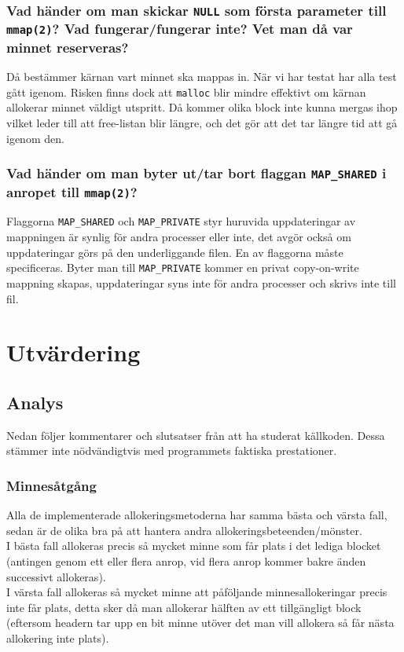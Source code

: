 \documentclass[a4paper]{article}
\begin{document}
\subsubsection*{Vad händer om man skickar \texttt{NULL} som första parameter till \texttt{mmap(2)}? Vad fungerar/fungerar inte? Vet man då var minnet reserveras?}
Då bestämmer kärnan vart minnet ska mappas in. När vi har testat har alla test gått igenom. Risken finns dock att \texttt{malloc} blir mindre effektivt om kärnan allokerar minnet väldigt utspritt. Då kommer olika block inte kunna mergas ihop vilket leder till att free-listan blir längre, och det gör att det tar längre tid att gå igenom den.

\subsubsection*{Vad händer om man byter ut/tar bort flaggan \texttt{MAP\_SHARED} i anropet till \texttt{mmap(2)}?}
Flaggorna \texttt{MAP\_SHARED} och \texttt{MAP\_PRIVATE} styr huruvida uppdateringar av mappningen är synlig för andra processer eller inte, det avgör också om uppdateringar görs på den underliggande filen. En av flaggorna måste specificeras. Byter man till \texttt{MAP\_PRIVATE} kommer en privat copy-on-write mappning skapas, uppdateringar syns inte för andra processer och skrivs inte till fil.

\section*{Utvärdering}
\subsection*{Analys}
Nedan följer kommentarer och slutsatser från att ha studerat källkoden. Dessa stämmer inte nödvändigtvis med programmets faktiska prestationer.

\subsubsection*{Minnesåtgång}
Alla de implementerade allokeringsmetoderna har samma bästa och värsta fall, sedan är de olika bra på att hantera andra allokeringsbeteenden/mönster.
\\
I bästa fall allokeras precis så mycket minne som får plats i det lediga blocket (antingen genom ett eller flera anrop, vid flera anrop kommer bakre änden successivt allokeras).
\\
I värsta fall allokeras så mycket minne att påföljande minnesallokeringar precis inte får plats, detta sker då man allokerar hälften av ett tillgängligt block (eftersom headern tar upp en bit minne utöver det man vill allokera så får nästa allokering inte plats).
\end{document}
